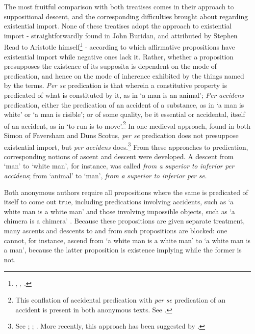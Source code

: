 	The most fruitful comparison with both treatises comes in their approach to suppositional descent, and the corresponding difficulties brought about regarding existential import. None of these treatises adopt the approach to existential import - straightforwardly found in John Buridan, and  attributed by Stephen Read to Aristotle himself\footnote{\cite[q. I. 38]{BuridanPostAn}, \cite{Klima2001}, \cite{Read2015b}.} - according to which affirmative propositions have existential import while negative ones lack it. Rather, whether a proposition presupposes the existence of its supposita is dependent on the mode of predication, and hence on the mode of inherence exhibited by the things named by the terms. \textit{Per se} predication is that wherein a constitutive property is predicated of what is constituted by it, as in `a man is an animal'; \textit{Per accidens} predication, either the predication of an accident of a substance, as in `a man is white' or `a man is risible'; or of some quality, be it essential or accidental, itself of an accident, as in `to run is to move'.\footnote{This conflation of accidental predication with \textit{per se} predication of an accident is present in both anonymous texts. See \cite[pp. 10-11, par. 35-36; 25, par. 66]{Green-Pedersen1980a}.} In one medieval approach, found in both Simon of Faversham and Duns Scotus, \textit{per se} predication does not presuppose existential import, but \textit{per accidens} does.\footnote{See \cite[q. I. 56]{FavershamQE}; \cite[I. qq. 5-8. par. 49, 74]{ScotusPeriHerm}; \cite[q. 11, par. 19]{ScotusQE}. More recently, this approach has been suggested by \cite{CIFOL1}.} From these approaches to predication, corresponding notions of ascent and descent were developed. A descent from `man' to `white man', for instance, was called \textit{from a superior to inferior per accidens}; from `animal' to `man', \textit{from a superior to inferior per se}. 
	
	Both anonymous authors require all propositions where the same is predicated of itself to come out true, including predications involving accidents, such as `a white man is a white man' and those involving impossible objects, such as `a chimera is a chimera' \autocite[p. 8, par. 23; p. 11, par. 36-37; p. 18, par. 31-32]{Green-Pedersen1980a}. Because these propositions are given separate treatment, many ascents and descents to and from such propositions are blocked: one cannot, for instance, ascend from `a white man is a white man' to `a white man is a man', because the latter proposition is existence implying while the former is not. 
	
